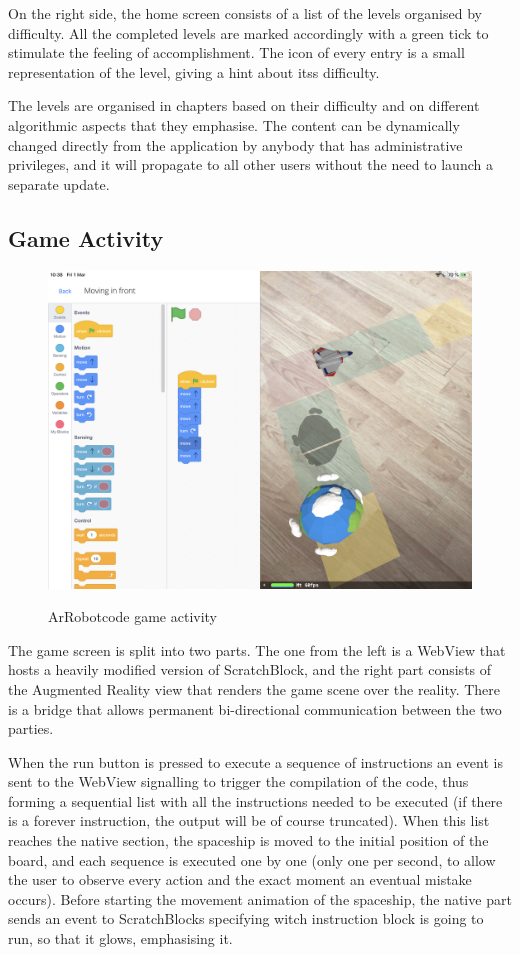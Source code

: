 \documentclass[12 pct]{report}
\begin{document}
On the right side, the home screen consists of a list of the levels organised by difficulty. All the completed levels are marked accordingly with a green tick to stimulate the feeling of accomplishment. The icon of every entry is a small representation of the level, giving a hint about itss difficulty. 

The levels are organised in chapters based on their difficulty and on different algorithmic aspects that they emphasise. The content can be dynamically changed directly from the application by anybody that has administrative privileges, and it will propagate to all other users without the need to launch a separate update.


\subsection*{Game Activity}
\begin{figure}[H]
\includegraphics[width=1.0\textwidth]{ArRobotCode2}
\centering
\label{fig:hololens}
\caption{ArRobotcode game activity}
\end{figure}
The game screen is split into two parts. The one from the left is a WebView that hosts a heavily modified version of ScratchBlock, and the right part consists of the Augmented Reality view that renders the game scene over the reality. There is a bridge that allows permanent bi-directional communication between the two parties.

When the run button is pressed to execute a sequence of instructions an event is sent to the WebView signalling to trigger the compilation of the code, thus forming a sequential list with all the instructions needed to be executed (if there is a forever instruction, the output will be of course truncated). When this list reaches the native section, the spaceship is moved to the initial position of the board, and each sequence is executed one by one (only one per second, to allow the user to observe every action and the exact moment an eventual mistake occurs). Before starting the movement animation of the spaceship, the native part sends an event to ScratchBlocks specifying witch instruction block is going to run, so that it glows, emphasising it.
\end{document}
